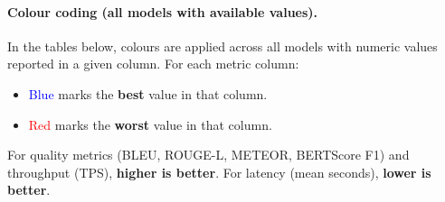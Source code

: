 \paragraph{Colour coding (all models with available values).}
In the tables below, colours are applied across all models with numeric values reported in a given column.
For each metric column:
\begin{itemize}
    \item \textcolor{blue}{Blue} marks the \textbf{best} value in that column.
    \item \textcolor{red}{Red} marks the \textbf{worst} value in that column.
\end{itemize}
For quality metrics (BLEU, ROUGE-L, METEOR, BERTScore F1) and throughput (TPS), \textbf{higher is better}.
For latency (mean seconds), \textbf{lower is better}.

\begin{table}[h]
\centering
\caption{Evaluation metrics on eval\_OK for FSD (quality + efficiency, SLMs vs.\ LLM baselines).}
\label{tab:metrics-fsd}
\small
{}
\end{table}
\FloatBarrier


